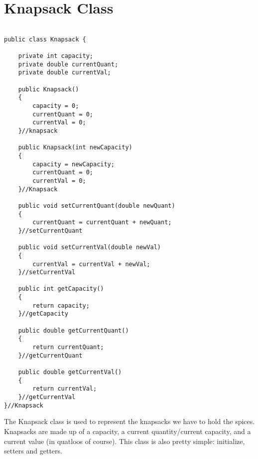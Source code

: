 \documentclass{article}
\begin{document}
\section{Knapsack Class}
\begin{lstlisting}[frame =single,
backgroundcolor = \color{grey!12}]

public class Knapsack {

	private int capacity;
	private double currentQuant;
	private double currentVal;
	
	public Knapsack()
	{
		capacity = 0;
		currentQuant = 0;
		currentVal = 0;
	}//knapsack
	
	public Knapsack(int newCapacity)
	{
		capacity = newCapacity;
		currentQuant = 0;
		currentVal = 0;
	}//Knapsack
	
	public void setCurrentQuant(double newQuant)
	{
		currentQuant = currentQuant + newQuant;
	}//setCurrentQuant
	
	public void setCurrentVal(double newVal)
	{
		currentVal = currentVal + newVal;
	}//setCurrentVal
	
	public int getCapacity()
	{
		return capacity;
	}//getCapacity
	
	public double getCurrentQuant()
	{
		return currentQuant;
	}//getCurrentQuant
	
	public double getCurrentVal()
	{
		return currentVal;
	}//getCurrentVal
}//Knapsack
\end{lstlisting}
\large
The Knapsack class is used to represent the knapsacks we have to hold the spices. Knapsacks are made up of a capacity, a current quantity/current capacity, and a current value (in quatloos of course). This class is also pretty simple: initialize, setters and getters.  

\small
\end{document}
